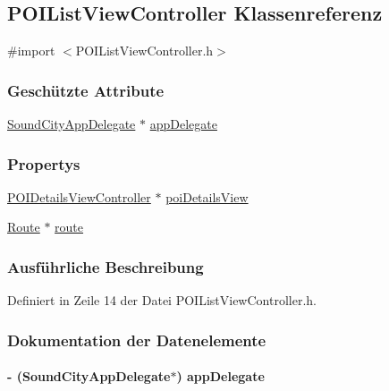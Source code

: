 \hypertarget{interface_p_o_i_list_view_controller}{
\subsection{POIListViewController Klassenreferenz}
\label{interface_p_o_i_list_view_controller}
}


{\ttfamily \#import $<$POIListViewController.h$>$}\subsubsection*{Geschützte Attribute}
\begin{DoxyCompactItemize}
\item 
\hyperlink{interface_sound_city_app_delegate}{SoundCityAppDelegate} $\ast$ \hyperlink{interface_p_o_i_list_view_controller_a67217b9852223442adee7e4b4f194b71}{appDelegate}
\end{DoxyCompactItemize}
\subsubsection*{Propertys}
\begin{DoxyCompactItemize}
\item 
\hyperlink{interface_p_o_i_details_view_controller}{POIDetailsViewController} $\ast$ \hyperlink{interface_p_o_i_list_view_controller_a59f9a24f115734414dccd160f9ed2856}{poiDetailsView}
\item 
\hyperlink{interface_route}{Route} $\ast$ \hyperlink{interface_p_o_i_list_view_controller_aa0bee7280ba1b0c3f904da878c120922}{route}
\end{DoxyCompactItemize}


\subsubsection{Ausführliche Beschreibung}


Definiert in Zeile 14 der Datei POIListViewController.h.

\subsubsection{Dokumentation der Datenelemente}
\hypertarget{interface_p_o_i_list_view_controller_a67217b9852223442adee7e4b4f194b71}{
\paragraph[{appDelegate}]{\setlength{\rightskip}{0pt plus 5cm}-\/ ({\bf SoundCityAppDelegate}$\ast$) {\bf appDelegate}}\hfill}
\label{interface_p_o_i_list_view_controller_a67217b9852223442adee7e4b4f194b71}


